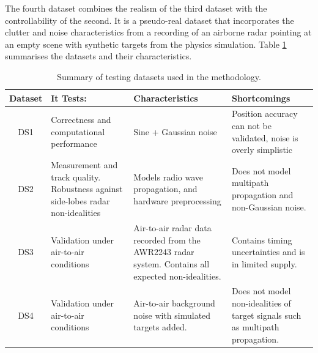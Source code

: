 The fourth dataset combines the realism of the third dataset with the controllability of the second. 
It is a pseudo-real dataset 
that incorporates the clutter and noise characteristics from a recording of an airborne radar pointing at an 
empty scene with synthetic targets from the physics simulation. 
Table \ref{tab:datasets} summarises the datasets and their characteristics.

\begin{table}[htbp]
    \centering
    \caption{Summary of testing datasets used in the methodology.}
    \begin{tabular}{|c|p{3cm}|p{5cm}|p{5cm}|}
        \hline
        Dataset & It Tests: & Characteristics & Shortcomings \\
        \hline
        DS1 & Correctness and computational performance & Sine + Gaussian noise & Position 
        accuracy can not be validated, noise is overly simplistic \\
        \hline
        DS2 & Measurement and track quality. Robustness against side-lobes radar non-idealities & Models 
        radio wave propagation, and hardware preprocessing & Does not model multipath propagation and 
        non-Gaussian noise. \\
        \hline
        DS3 & Validation under air-to-air conditions & Air-to-air radar data recorded from the 
        AWR2243 radar system. Contains all expected non-idealities. & 
        Contains timing uncertainties and is in limited supply. \\
        \hline
        DS4 & Validation under air-to-air conditions & Air-to-air background noise with simulated targets added. &
        Does not model non-idealities of target signals such as multipath propagation. \\
        \hline
    \end{tabular}
    \label{tab:datasets}
\end{table}